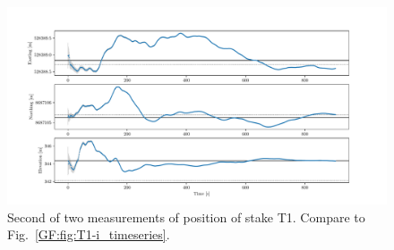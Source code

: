\begin{figure}[H]
    \centering
    \includegraphics[width=\textwidth]{./figs/timeseries/46250723_corr-T1-ii-2017_Timeseries-east-north-elev.pdf}
    \caption{Second of two measurements of position of stake T1. Compare to Fig.~\ref{GF:fig:T1-i_timeseries}.}
    \label{GF:fig:T1-ii_timeseries}
\end{figure}